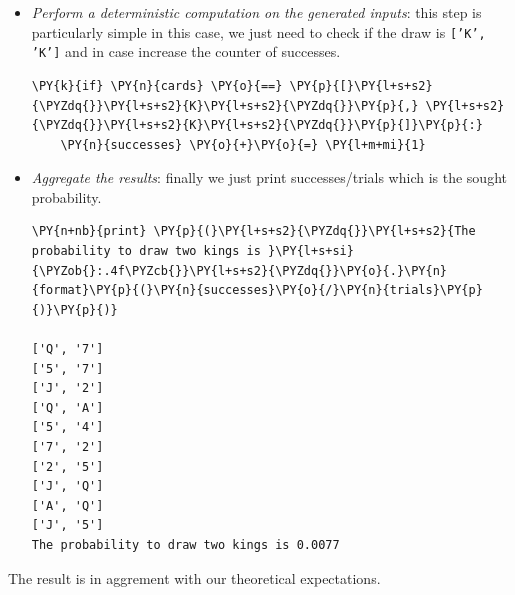 \begin{itemize}
\begin{tcolorbox}[breakable, size=fbox, boxrule=1pt, pad at break*=1mm,colback=cellbackground, colframe=cellborder]
\begin{Verbatim}[commandchars=\\\{\}]
\PY{k}{for} \PY{n}{i} \PY{o+ow}{in} \PY{n+nb}{range}\PY{p}{(}\PY{n}{trials}\PY{p}{)}\PY{p}{:}
  \PY{n}{cards} \PY{o}{=} \PY{n}{sample}\PY{p}{(}\PY{n}{deck}\PY{p}{,} \PY{n}{k}\PY{o}{=}\PY{l+m+mi}{2}\PY{p}{)}
  \PY{k}{if} \PY{n}{i} \PY{o}{\PYZlt{}} \PY{l+m+mi}{10}\PY{p}{:}
    \PY{n+nb}{print} \PY{p}{(}\PY{n}{cards}\PY{p}{)}
\end{Verbatim}
\end{tcolorbox}

\item \emph{Perform a deterministic computation on the generated inputs}: this step is particularly simple in this case, we just need to check if the draw is \texttt{['K', 'K']} and in case increase the counter of successes.

\begin{tcolorbox}[breakable, size=fbox, boxrule=1pt, pad at break*=1mm,colback=cellbackground, colframe=cellborder]
\begin{Verbatim}[commandchars=\\\{\}]
  \PY{k}{if} \PY{n}{cards} \PY{o}{==} \PY{p}{[}\PY{l+s+s2}{\PYZdq{}}\PY{l+s+s2}{K}\PY{l+s+s2}{\PYZdq{}}\PY{p}{,} \PY{l+s+s2}{\PYZdq{}}\PY{l+s+s2}{K}\PY{l+s+s2}{\PYZdq{}}\PY{p}{]}\PY{p}{:}
    \PY{n}{successes} \PY{o}{+}\PY{o}{=} \PY{l+m+mi}{1}
 \end{Verbatim}
\end{tcolorbox}

\item \emph{Aggregate the results}: finally we just print successes/trials which is the sought probability.

\begin{tcolorbox}[breakable, size=fbox, boxrule=1pt, pad at break*=1mm,colback=cellbackground, colframe=cellborder]
\begin{Verbatim}[commandchars=\\\{\}]
\PY{n+nb}{print} \PY{p}{(}\PY{l+s+s2}{\PYZdq{}}\PY{l+s+s2}{The probability to draw two kings is }\PY{l+s+si}{\PYZob{}:.4f\PYZcb{}}\PY{l+s+s2}{\PYZdq{}}\PY{o}{.}\PY{n}{format}\PY{p}{(}\PY{n}{successes}\PY{o}{/}\PY{n}{trials}\PY{p}{)}\PY{p}{)}

['Q', '7']
['5', '7']
['J', '2']
['Q', 'A']
['5', '4']
['7', '2']
['2', '5']
['J', 'Q']
['A', 'Q']
['J', '5']
The probability to draw two kings is 0.0077
    \end{Verbatim}
\end{tcolorbox}
\end{itemize}
The result is in aggrement with our theoretical expectations.

